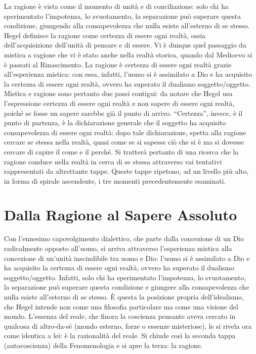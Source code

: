 \documentclass[a4paper,12pt,oneside,openany]{book}%
\begin{document}
La ragione è vista come il momento di unità e di conciliazione: solo chi ha sperimentato l’impotenza, lo svuotamento, la separazione può superare questa condizione, giungendo alla consapevolezza che nulla esiste all’esterno di se stesso. Hegel definisce la ragione come certezza di essere ogni realtà, ossia dell’acquisizione dell’unità di pensare e di essere. Vi è dunque quel passaggio da mistica a ragione che vi è stato anche nella realtà storica, quando dal Medioevo si è passati al Rinascimento. La ragione è certezza di essere ogni realtà grazie all’esperienza mistica: con essa, infatti, l’uomo si è assimilato a Dio e ha acquisito la certezza di essere ogni realtà, ovvero ha superato il dualismo soggetto/oggetto. Mistica e ragione sono pertanto due passi contigui: da notare che Hegel usa l’espressione certezza di essere ogni realtà e non sapere di essere ogni realtà, poiché se fosse un sapere sarebbe già il punto di arrivo. “Certezza”, invece, è il punto di partenza, è la dichiarazione generale che il soggetto ha acquisito consapevolezza di essere ogni realtà: dopo tale dichiarazione, spetta alla ragione cercare se stessa nella realtà, quasi come se si sapesse ciò che si è ma si dovesse cercare di capire il come e il perché. Si tratterà pertanto di una ricerca che la ragione conduce nella realtà in cerca di se stessa attraverso vai tentativi rappresentati da altrettante tappe. Queste tappe ripetono, ad un livello più alto, in forma di spirale ascendente, i tre momenti precedentemente esaminati.

\newpage	
	
\section*{Dalla Ragione al Sapere Assoluto}	
	
Con l’ennesimo capovolgimento dialettico, che parte dalla concezione di un Dio radicalmente opposto all’uomo, si arriva attraverso l’esperienza mistica alla concezione di un’unità inscindibile tra uomo e Dio: l’uomo si è assimilato a Dio e ha acquisito la certezza di essere ogni realtà, ovvero ha superato il dualismo soggetto/oggetto. Infatti, solo chi ha sperimentato l’impotenza, lo svuotamento, la separazione può superare questa condizione e giungere alla consapevolezza che nulla esiste all’esterno di se stesso. È questa la posizione propria dell’idealismo, che Hegel intende non come una filosofia particolare ma come una visione del mondo. L’essenza del reale, che finora la coscienza pensante aveva cercato in qualcosa di altro-da-sè (mondo esterno, forze o essenze misteriose), le si rivela ora come identica a lei: è la razionalità del reale. Si chiude così la seconda tappa (autocoscienza) della Fenomenologia e si apre la terza: la ragione.
\end{document}
